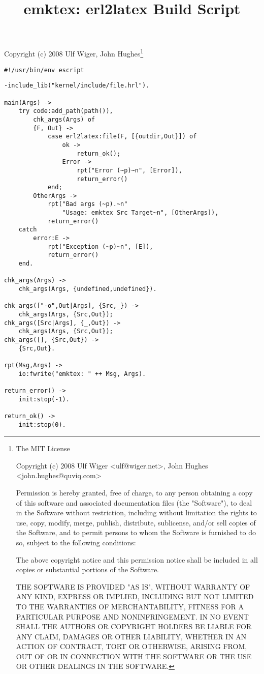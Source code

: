 \documentclass[a4paper,12pt]{article}
\newenvironment{mylisting}
{\begin{list}{}{\setlength{\leftmargin}{1em}}\item\scriptsize\bfseries}
{\end{list}}
\begin{document}
\title{emktex: erl2latex Build Script}
\maketitle
Copyright (c) 2008 Ulf Wiger, John Hughes\footnote{
\tiny{The MIT License

Copyright (c) 2008 Ulf Wiger <ulf@wiger.net>,
John Hughes <john.hughes@quviq.com>

Permission is hereby granted, free of charge, to any person obtaining a
copy of this software and associated documentation files (the "Software"),
to deal in the Software without restriction, including without limitation
the rights to use, copy, modify, merge, publish, distribute, sublicense,
and/or sell copies of the Software, and to permit persons to whom the
Software is furnished to do so, subject to the following conditions:

The above copyright notice and this permission notice shall be included in
all copies or substantial portions of the Software.

THE SOFTWARE IS PROVIDED "AS IS", WITHOUT WARRANTY OF ANY KIND, EXPRESS OR
IMPLIED, INCLUDING BUT NOT LIMITED TO THE WARRANTIES OF MERCHANTABILITY,
FITNESS FOR A PARTICULAR PURPOSE AND NONINFRINGEMENT. IN NO EVENT SHALL
THE AUTHORS OR COPYRIGHT HOLDERS BE LIABLE FOR ANY CLAIM, DAMAGES OR OTHER
LIABILITY, WHETHER IN AN ACTION OF CONTRACT, TORT OR OTHERWISE, ARISING 
FROM, OUT OF OR IN CONNECTION WITH THE SOFTWARE OR THE USE OR OTHER
DEALINGS IN THE SOFTWARE.
}}
\begin{mylisting}
\begin{verbatim}
#!/usr/bin/env escript
\end{verbatim}
\end{mylisting}

\begin{mylisting}
\begin{verbatim}
-include_lib("kernel/include/file.hrl").

main(Args) ->
    try code:add_path(path()),
        chk_args(Args) of
        {F, Out} ->
            case erl2latex:file(F, [{outdir,Out}]) of
                ok ->
                    return_ok();
                Error ->
                    rpt("Error (~p)~n", [Error]),
                    return_error()
            end;
        OtherArgs ->
            rpt("Bad args (~p).~n"
                "Usage: emktex Src Target~n", [OtherArgs]),
            return_error()
    catch
        error:E ->
            rpt("Exception (~p)~n", [E]),
            return_error()
    end.

chk_args(Args) ->
    chk_args(Args, {undefined,undefined}).

chk_args(["-o",Out|Args], {Src,_}) ->
    chk_args(Args, {Src,Out});
chk_args([Src|Args], {_,Out}) ->
    chk_args(Args, {Src,Out});
chk_args([], {Src,Out}) ->
    {Src,Out}.

rpt(Msg,Args) ->
    io:fwrite("emktex: " ++ Msg, Args).

return_error() ->
    init:stop(-1).

return_ok() ->
    init:stop(0).
\end{verbatim}
\end{mylisting}
\end{document}
